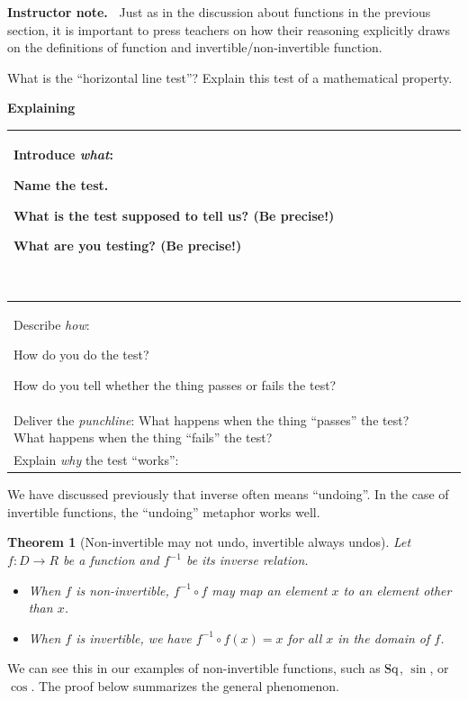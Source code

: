 \documentclass[11pt]{article}
\newenvironment{bignote}[1][Instructor note]%
	{\begin{mdframed}\raggedright{\bf #1.~}}
	{\end{mdframed}}
\newenvironment{task}
	{\begin{mdframed}[linecolor=lightgray, linewidth=3pt]\raggedright}
	{\end{mdframed}}
\newcommand\tn{\textnormal}
\newtheorem{theorem}{Theorem}[section]
\theoremstyle{definition}
\begin{document}
\begin{bignote}
Just as in the discussion about functions in the previous section, it is important to press teachers on how their reasoning explicitly draws on the definitions of function and invertible/non-invertible function. 
\end{bignote}

\begin{task}
What is the ``horizontal line test''? Explain this test of a mathematical property.  

\begin{center}
{\bf Explaining  \underline{\hspace*{2in}}}
\end{center}
\begin{tabular}{|L{2.2in}|L{3.7in}|}
\hline 
Introduce {\it what}:	
	\begin{itemize*}
	\item Name the test.
	\item What is the test supposed to tell us? (Be precise!) 
	\item What are you testing? (Be precise!) 
	\end{itemize*} \vspace*{-12pt}$\;$
	& 

	\\ \hline 
Describe {\it how}:
	\begin{itemize*}
	\item How do you do the test?
	\item How do you tell whether the thing passes or fails the test?
	\end{itemize*}
	& 

	\\ \hline 
Deliver the {\it punchline}: What happens when the thing ``passes'' the test? What happens when the thing ``fails'' the test?
	& 

	 \\ \hline 
Explain {\it why} the test ``works'': 
	& 
	\\ \hline 
\end{tabular}
\end{task}

We have discussed previously that inverse often means ``undoing''. In the case of invertible functions, the ``undoing'' metaphor works well.
\begin{theorem}[Non-invertible may not undo, invertible always undos]
Let $f:D\to R$ be a function and $f^{-1}$ be its inverse relation.
	\begin{itemize}
	\item When $f$ is non-invertible, $f^{-1}\circ f$ may map an element $x$ to an element other than $x$.
	\item When $f$ is invertible, we have $f^{-1}\circ f(x)=x$ for all $x$ in the domain of $f$.
	\end{itemize}
\end{theorem}
We can see this in our examples of non-invertible functions, such as $\tn{Sq}$, $\sin$, or $\cos$. The proof below summarizes the general phenomenon.
\end{document}
